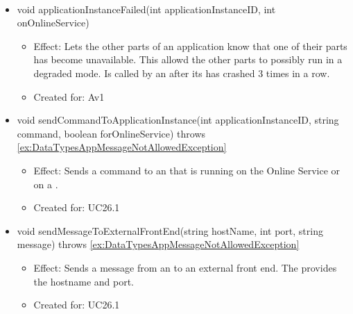 \begin{description}
      \item[Operations:] ~
    \begin{itemize}[noitemsep,nolistsep,leftmargin=-.25cm]
      \item \textsf{void applicationInstanceFailed(int applicationInstanceID, int onOnlineService)}
        \begin{itemize}[noitemsep,nolistsep]
           \item Effect: Lets the other parts of an application know that one of their parts has become unavailable. This allowd the other parts to possibly run in a degraded mode. Is called by an  after its  has crashed 3 times in a row.
\item Created for: Av1
        \end{itemize}
      \item \textsf{void sendCommandToApplicationInstance(int applicationInstanceID, string command, boolean forOnlineService) throws \ref{ex:DataTypesAppMessageNotAllowedException}}
        \begin{itemize}[noitemsep,nolistsep]
           \item Effect: Sends a command to an  that is running on the Online Service or on a .
\item Created for: UC26.1
        \end{itemize}
      \item \textsf{void sendMessageToExternalFrontEnd(string hostName, int port, string message) throws \ref{ex:DataTypesAppMessageNotAllowedException}}
        \begin{itemize}[noitemsep,nolistsep]
           \item Effect: Sends a message from an  to an external front end. The  provides the hostname and port.
\item Created for: UC26.1
        \end{itemize}
    \end{itemize}
    \end{description}

